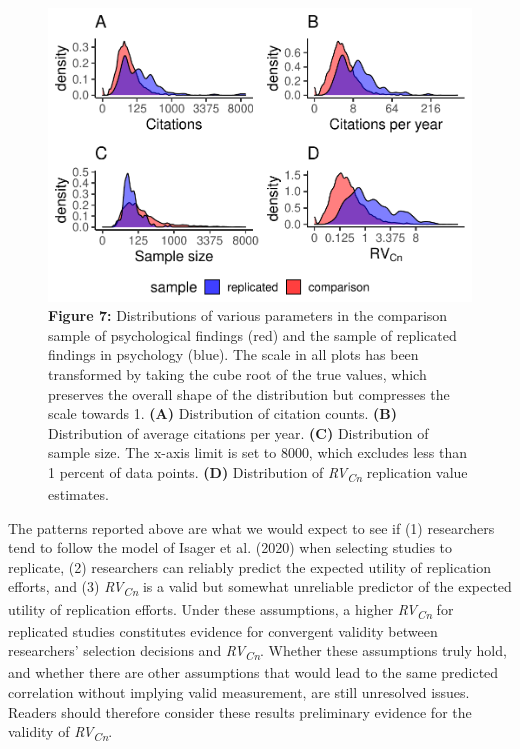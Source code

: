 \documentclass[
  english,
  jou,floatsintext]{apa6}
\begin{document}
\begin{figure}
\includegraphics{RVcn_manuscript_files/figure-latex/7-1} \caption{\textbf{Figure 7:} Distributions of various parameters in the comparison sample of psychological findings (red) and the sample of replicated findings in psychology (blue). The scale in all plots has been transformed by taking the cube root of the true values, which preserves the overall shape of the distribution but compresses the scale towards 1. \textbf{(A)} Distribution of citation counts. \textbf{(B)} Distribution of average citations per year. \textbf{(C)} Distribution of sample size. The x-axis limit is set to 8000, which excludes less than 1 percent of data points. \textbf{(D)} Distribution of \textit{RV\textsubscript{Cn}} replication value estimates.}\label{fig:7}
\end{figure}

The patterns reported above are what we would expect to see if (1) researchers tend to follow the model of Isager et al. (2020) when selecting studies to replicate, (2) researchers can reliably predict the expected utility of replication efforts, and (3) \emph{RV\textsubscript{Cn}} is a valid but somewhat unreliable predictor of the expected utility of replication efforts. Under these assumptions, a higher \emph{RV\textsubscript{Cn}} for replicated studies constitutes evidence for convergent validity between researchers' selection decisions and \emph{RV\textsubscript{Cn}}. Whether these assumptions truly hold, and whether there are other assumptions that would lead to the same predicted correlation without implying valid measurement, are still unresolved issues. Readers should therefore consider these results preliminary evidence for the validity of \emph{RV\textsubscript{Cn}}.
\end{document}
